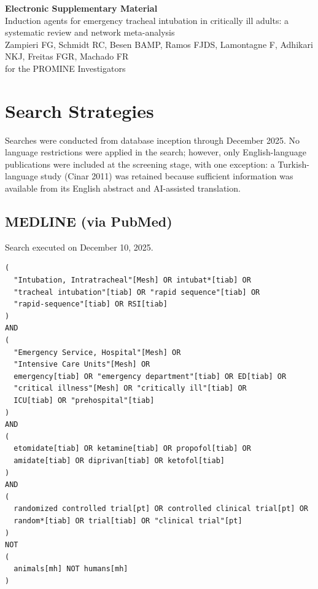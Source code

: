 \documentclass[11pt]{article}
\begin{document}
\begin{center}
{\LARGE\bfseries Electronic Supplementary Material}\\[12pt]
{\large Induction agents for emergency tracheal intubation in critically ill adults: a systematic review and network meta-analysis}\\[8pt]
{\normalsize Zampieri FG, Schmidt RC, Besen BAMP, Ramos FJDS, Lamontagne F, Adhikari NKJ, Freitas FGR, Machado FR}\\[4pt]
{\normalsize for the PROMINE Investigators}
\end{center}

\vspace{1cm}
\tableofcontents
\newpage

\section{Search Strategies}
\label{sec:search}

Searches were conducted from database inception through December 2025. No language restrictions were applied in the search; however, only English-language publications were included at the screening stage, with one exception: a Turkish-language study (Cinar 2011) was retained because sufficient information was available from its English abstract and AI-assisted translation.

\subsection{MEDLINE (via PubMed)}

Search executed on December 10, 2025.

\begin{verbatim}
(
  "Intubation, Intratracheal"[Mesh] OR intubat*[tiab] OR
  "tracheal intubation"[tiab] OR "rapid sequence"[tiab] OR
  "rapid-sequence"[tiab] OR RSI[tiab]
)
AND
(
  "Emergency Service, Hospital"[Mesh] OR
  "Intensive Care Units"[Mesh] OR
  emergency[tiab] OR "emergency department"[tiab] OR ED[tiab] OR
  "critical illness"[Mesh] OR "critically ill"[tiab] OR
  ICU[tiab] OR "prehospital"[tiab]
)
AND
(
  etomidate[tiab] OR ketamine[tiab] OR propofol[tiab] OR
  amidate[tiab] OR diprivan[tiab] OR ketofol[tiab]
)
AND
(
  randomized controlled trial[pt] OR controlled clinical trial[pt] OR
  random*[tiab] OR trial[tiab] OR "clinical trial"[pt]
)
NOT
(
  animals[mh] NOT humans[mh]
)
\end{verbatim}
\end{document}
